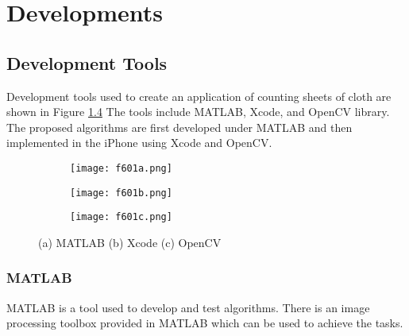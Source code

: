 
\chapter{Developments} %

\label{Chapter6} %



\section{Development Tools}

Development tools used to create an application of counting sheets of cloth are shown in Figure \ref{fig:f601} The tools include MATLAB, Xcode, and OpenCV library. The proposed algorithms are first developed under MATLAB and then implemented in the iPhone using Xcode and OpenCV.
\begin{figure}[t]
	\centering
	\begin{subfigure}[b]{0.2\textwidth}
		\texttt{[image: f601a.png]}
		\caption{}\label{fig:f601a}
	\end{subfigure}
	\begin{subfigure}[b]{0.2\textwidth}
		\texttt{[image: f601b.png]}
		\caption{}\label{fig:f601b}
	\end{subfigure}
	\begin{subfigure}[b]{0.2\textwidth}
		\texttt{[image: f601c.png]}
		\caption{}\label{fig:f601c}
	\end{subfigure}
	\caption{(a) MATLAB (b) Xcode (c) OpenCV}
	\label{fig:f601}
	
\end{figure}
\subsection{MATLAB}
MATLAB is a tool used to develop and test algorithms. There is an image processing toolbox provided in MATLAB which can be used to achieve the tasks.

